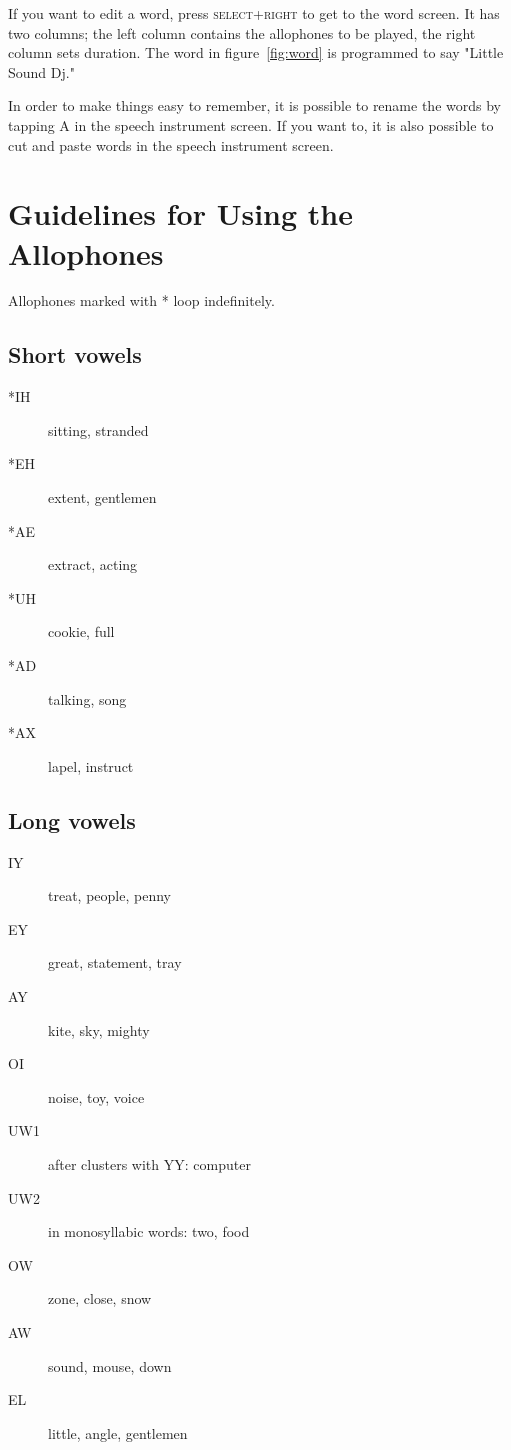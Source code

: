 		If you want to edit a word, press \textsc{select+right} to get to the word screen. It has two columns; the left column contains the allophones to be played, the right column sets duration. The word in figure~\ref{fig:word} is programmed to say "Little Sound Dj."

		In order to make things easy to remember, it is possible to rename the words by tapping A in the speech instrument screen. If you want to, it is also possible to cut and paste words in the speech instrument screen.

\section{Guidelines for Using the Allophones}

Allophones marked with * loop indefinitely. 

\subsection{Short vowels}

\begin{description}
\item[*IH] sitting, stranded
\item[*EH] extent, gentlemen
\item[*AE] extract, acting
\item[*UH] cookie, full
\item[*AD] talking, song
\item[*AX] lapel, instruct
\end{description}

\subsection{Long vowels}

\begin{description}
\item[IY] treat, people, penny
\item[EY] great, statement, tray
\item[AY] kite, sky, mighty
\item[OI] noise, toy, voice
\item[UW1] after clusters with YY: computer
\item[UW2] in monosyllabic words: two, food
\item[OW] zone, close, snow
\item[AW] sound, mouse, down
\item[EL] little, angle, gentlemen
\end{description}

